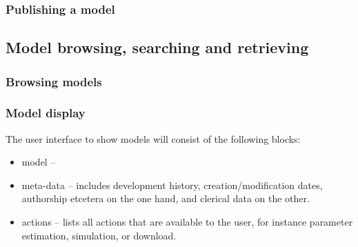 \subsubsection{Publishing a model}



\subsection{Model browsing, searching and retrieving}

\subsubsection{Browsing models}

\subsubsection{Model display}

The user interface to show models will consist of the following blocks:
\begin{itemize}
\item model --
\item meta-data -- includes development history, creation/modification dates, authorship etcetera on the one hand, and clerical data on the other.
\item actions -- lists all actions that are available to the user, for instance parameter estimation, simulation, or download.
\end{itemize}

